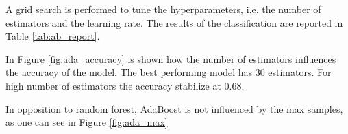 \documentclass[10pt, a4paper, twocolumn]{article}
\begin{document}
A grid search is performed to tune the hyperparameters, i.e. the number of estimators and the learning rate. The results of the classification are reported in Table \ref{tab:ab_report}.

\begin{table}
\centering
\caption{Classification report for Ada Boost}
\label{tab:ab_report}
\end{table}

In Figure \ref{fig:ada_accuracy} is shown how the number of estimators influences the accuracy of the model. The best performing model has 30 estimators. For high number of estimators the accuracy stabilize at 0.68.

In opposition to random forest, AdaBoost is not influenced by the max samples, as one can see in Figure \ref{fig:ada_max}
\end{document}
